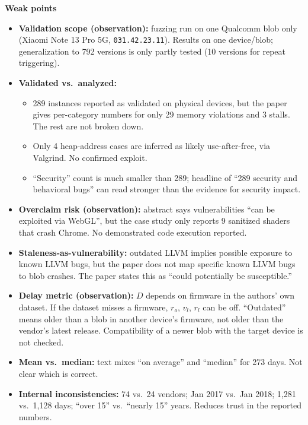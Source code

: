 \documentclass[11pt,a4paper]{article}
\begin{document}
\begin{enumerate}
    \vspace{4pt}
    \textbf{Weak points}
    \begin{itemize}[leftmargin=*, itemsep=1pt, topsep=2pt]
        \item \textbf{Validation scope (observation):} fuzzing run on one Qualcomm blob only (Xiaomi Note 13 Pro 5G, \texttt{031.42.23.11}). Results on one device/blob; generalization to 792 versions is only partly tested (10 versions for repeat triggering).
        \item \textbf{Validated vs.\ analyzed:}
        \begin{itemize}[itemsep=0pt]
            \item 289 instances reported as validated on physical devices, but the paper gives per-category numbers for only 29 memory violations and 3 stalls. The rest are not broken down.
            \item Only 4 heap-address cases are inferred as likely use-after-free, via Valgrind. No confirmed exploit.
            \item ``Security'' count is much smaller than 289; headline of ``289 security and behavioral bugs'' can read stronger than the evidence for security impact.
        \end{itemize}
        \item \textbf{Overclaim risk (observation):} abstract says vulnerabilities ``can be exploited via WebGL'', but the case study only reports 9 sanitized shaders that crash Chrome. No demonstrated code execution reported.
        \item \textbf{Staleness-as-vulnerability:} outdated LLVM implies possible exposure to known LLVM bugs, but the paper does not map specific known LLVM bugs to blob crashes. The paper states this as ``could potentially be susceptible.''
        \item \textbf{Delay metric (observation):} $D$ depends on firmware in the authors' own dataset. If the dataset misses a firmware, $r_o$, $v_l$, $r_l$ can be off. ``Outdated'' means older than a blob in another device's firmware, not older than the vendor's latest release. Compatibility of a newer blob with the target device is not checked.
        \item \textbf{Mean vs.\ median:} text mixes ``on average'' and ``median'' for 273 days. Not clear which is correct.
        \item \textbf{Internal inconsistencies:} 74 vs.\ 24 vendors; Jan 2017 vs.\ Jan 2018; 1,281 vs.\ 1,128 days; ``over 15'' vs.\ ``nearly 15'' years. Reduces trust in the reported numbers.

\end{itemize}
\end{enumerate}
\end{document}
